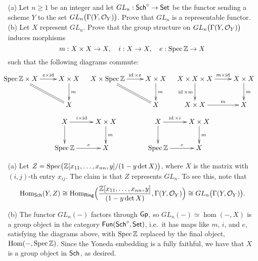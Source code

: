 \begin{exercise}[1.2]
  (a) Let $n\ge 1$ be an integer and let $GL_n:\text{\sf Sch}^\circ\to \text{\sf Set}$ be the functor sending
  a scheme $Y$ to the set $GL_n\bigl(\Gamma(Y,\mathcal{O}_Y)\bigr)$. Prove that $GL_n$ is a
  representable functor.\\
  (b) Let $X$ represent $GL_n$. Prove that the group structure on
  $GL_n\bigl(\Gamma(Y,\mathcal{O}_Y)\bigr)$ induces morphisms
  \[
     m:X\times X\to X,\quad i:X\to X,\quad e:\operatorname{Spec} \mathbb{Z}\to X
  \]
  such that the following diagrams commute:
  \[\hspace*{-1em}
   \xymatrix{\spec \ZZ \times X \ar[r]^<>(.5){e\times \id} \ar@{=}[dr] & X\times X \ar[d]^m \\ & X}
   \quad
   \xymatrix{X\times \spec \ZZ \ar[r]^<>(.5){\id\times e} \ar@{=}[dr] & X\times X \ar[d]^m \\ & X}
   \quad
   \xymatrix{
    X\times X\times X \ar[r]^<>(.5){m\times \id} \ar[d]_{\id\times m} & X\times X\ar[d]^m\\
    X\times X \ar[r]^<>(.5)m & X
   }\]
  \[
   \xymatrix{X\ar[r]^<>(.5){i\times \id}\ar[d] & X\times X \ar[d]^m\\ \spec \ZZ \ar[r]^<>(.5)e & X}
   \qquad\qquad
   \xymatrix{X\ar[r]^<>(.5){\id\times i}\ar[d] & X\times X \ar[d]^m\\ \spec \ZZ \ar[r]^<>(.5)e & X}
  \]
\end{exercise}
\begin{solution}
  (a) Let $Z=\operatorname{Spec} \bigl(\mathbb{Z}[x_{11},\dots, x_{nn},y]/(1-y \det X)\bigr)$, where $X$ is the
  matrix with $(i,j)$-th entry $x_{ij}$. The claim is that $Z$ represents $GL_n$. To see
  this, note that
  \[\operatorname{Hom}_{\text{\sf Sch}} (Y,Z) \cong \operatorname{Hom}_{\text{\sf Ring}}\Bigl(\frac{\mathbb{Z}[x_{11},\dots,
  x_{nn},y]}{(1-y \det X)}, \Gamma(Y,\mathcal{O}_Y)\Bigr) \cong GL_n\bigl(\Gamma(Y,\mathcal{O}_Y)\bigr).\]

  (b)  The functor $GL_n(-)$ factors through $\text{\sf Gp}$, so $GL_n(-)\simeq\hom(-,X)$ is a group object in the category $\operatorname{\sf Fun}(\text{\sf Sch}^\circ,\text{\sf Set})$, i.e.~it has maps like $m$, $i$, and $e$, satisfying the diagrams above, with $\operatorname{Spec} \mathbb{Z}$ replaced by the final object, $\operatorname{Hom}(-,\operatorname{Spec} \mathbb{Z})$. Since the Yoneda embedding is a fully faithful, we have that $X$ is a group object in $\text{\sf Sch}$, as desired.
\end{solution}

